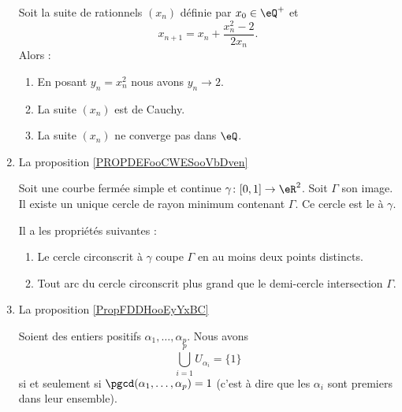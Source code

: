 \begin{enumerate}
    \begin{proposition}
    Soit la suite de rationnels \( (x_n)\) définie par \( x_0\in \eQ^+\) et 
    \begin{equation}
        x_{n+1}=x_n+\frac{ x_n^2-2 }{ 2x_n }.
    \end{equation}
    Alors :
    \begin{enumerate}
        \item
            En posant \( y_n=x_n^2\) nous avons \( y_n\to 2\).
        \item
            La suite \( (x_n)\) est de Cauchy.
        \item
            La suite \( (x_n)\) ne converge pas dans \( \eQ\).
    \end{enumerate}
\end{proposition}

\item La proposition \ref{PROPDEFooCWESooVbDven}

\begin{propositionDef}
    Soit une courbe fermée simple et continue \( \gamma\colon \mathopen[ 0 , 1 \mathclose]\to \eR^2\). Soit \( \Gamma\) son image. Il existe un unique cercle de rayon minimum contenant \( \Gamma\). Ce cercle est le  à \( \gamma\).

    Il a les propriétés suivantes :
    \begin{enumerate}
        \item
            Le cercle circonscrit à \( \gamma\) coupe \( \Gamma\) en au moins deux points distincts.
        \item
            Tout arc du cercle circonscrit plus grand que le demi-cercle intersection \( \Gamma\).
    \end{enumerate}
\end{propositionDef}


\item La proposition \ref{PropFDDHooEyYxBC}
    \begin{proposition}
    Soient des entiers positifs \( \alpha_1,\ldots, \alpha_p\). Nous avons
    \begin{equation}
        \bigcup_{i=1}^pU_{\alpha_i}=\{ 1 \}
    \end{equation}
    si et seulement si \( \pgcd(\alpha_1,\ldots, \alpha_p)=1\) (c'est à dire que les \( \alpha_i\) sont premiers dans leur ensemble).
\end{proposition}


\end{enumerate}

